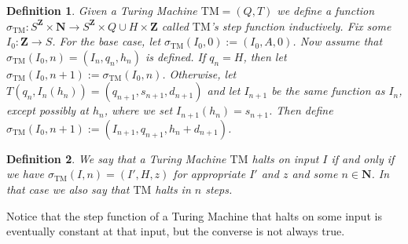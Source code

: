 \documentclass[leqno]{article}
\newtheorem{definition}{Definition}[section]
\newcommand{\N}{\mathbf{N}}
\newcommand{\Z}{\mathbf{Z}}
\newcommand{\step}[1]{\sigma_{\mathrm{#1}}}
\begin{document}
\begin{definition}
  Given a Turing Machine $\mathrm{TM} = (Q, T)$ we define a function $\step{TM}: S^{\Z} \times \N \to S^{\Z} \times Q \cup {H} \times \Z$ called $\mathrm{TM}$'s step function inductively. Fix some $I_0: \Z \to S$. For the base case, let $\step{TM}(I_0, 0) := (I_0, A, 0)$. Now assume that $\step{TM}(I_0, n) = (I_n, q_n, h_n)$ is defined. If $q_n = H$, then let $\step{TM}(I_0, n+1) := \step{TM}(I_0, n)$. Otherwise, let $T(q_n, I_n(h_n)) = (q_{n+1}, s_{n+1}, d_{n+1})$ and let $I_{n+1}$ be the same function as $I_n$, except possibly at $h_n$, where we set $I_{n+1}(h_n) = s_{n+1}$. Then define $\step{TM}(I_0, n+1) := (I_{n+1}, q_{n+1}, h_n+d_{n+1})$.
\end{definition}

\begin{definition}
  We say that a Turing Machine $\mathrm{TM}$ halts on input $I$ if and only if we have $\step{TM}(I, n) = (I', H, z)$ for appropriate $I'$ and $z$ and some $n \in \N$. In that case we also say that $\mathrm{TM}$ halts in $n$ steps. 
\end{definition}

Notice that the step function of a Turing Machine that halts on some input is eventually constant at that input, but the converse is not always true.
\end{document}
